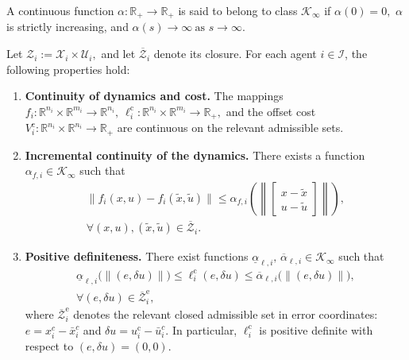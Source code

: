 \documentclass[twocolumn]{autart}
\begin{document}
\begin{definition}
\label{def:Kinf}
A continuous function $\alpha:\mathbb{R}_+\to\mathbb{R}_+$ is said to belong to class $\mathcal K_\infty$ if
\(
\alpha(0)=0,
\)
$\alpha$ is strictly increasing, and
\(
\alpha(s)\to\infty
\ \text{as } s\to\infty.
\)
\end{definition}

\begin{assumption}
\label{ass:regularity_cost}
Let
\(
\mathcal Z_i := \mathcal X_i\times\mathcal U_i,
\)
and let $\overline{\mathcal Z}_i$ denote its closure.
For each agent $i\in\mathcal I$, the following properties hold:

\begin{enumerate}
    \item \textbf{Continuity of dynamics and cost.}
    The mappings
    \(
    f_i:\mathbb R^{n_i}\times\mathbb R^{m_i}\to\mathbb R^{n_i},
    \
    \ell_i^{\mathrm c}:\mathbb R^{n_i}\times\mathbb R^{m_i}\to\mathbb R_+,
    \)
    and the offset cost
    \(
    V_i^{\mathrm c}:\mathbb R^{n_i}\times\mathbb R^{n_i}\to\mathbb R_+
    \)
    are continuous on the relevant admissible sets.

    \item \textbf{Incremental continuity of the dynamics.}
    There exists a function $\alpha_{f,i}\in\mathcal K_\infty$ such that
    \begin{align*}
    \|f_i(x,u)-f_i(\tilde x,\tilde u)\|
    \le
    \alpha_{f,i}\!\left(
    \left\|
    \begin{bmatrix}
    x-\tilde x\\
    u-\tilde u
    \end{bmatrix}
    \right\|
    \right),
    \\
    \forall (x,u),(\tilde x,\tilde u)\in\overline{\mathcal Z}_i.
    \end{align*}

    \item \textbf{Positive definiteness.}
    There exist functions
    \(
    \underline{\alpha}_{\ell,i},\,\overline{\alpha}_{\ell,i}\in\mathcal K_\infty
    \)
    such that
    \begin{equation}
    \begin{aligned}
    \underline{\alpha}_{\ell,i}\!\bigl(\|(e,\delta u)\|\bigr)
    \le
    \ell_i^{\mathrm c}(e,\delta u)
    \le
    \overline{\alpha}_{\ell,i}\!\bigl(\|(e,\delta u)\|\bigr),
    \\
    \forall (e,\delta u)\in\overline{\mathcal Z}^{\mathrm e}_i,
    \label{eq:stage_cost_bounds}
    \end{aligned}
    \end{equation}
    where $\overline{\mathcal Z}^{\mathrm e}_i$ denotes the relevant closed admissible set in error coordinates: $e = x_i^c-\bar{x}_i^c$ and $\delta u = u_i^\mathrm{c}-\bar{u}_i^c$.
    In particular, $\ell_i^{\mathrm c}$ is positive definite with respect to $(e,\delta u)=(0,0)$.


\end{enumerate}
\end{assumption}
\end{document}
